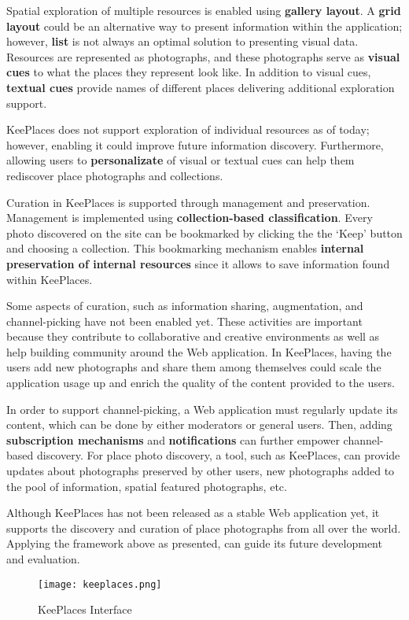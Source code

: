 {Spatial exploration of multiple resources is enabled using \textbf{gallery layout}. A \textbf{grid layout} could be an alternative way to present information within the application; however, \textbf{list} is not always an optimal solution to presenting visual data. 
Resources are represented as photographs, and these photographs serve as \textbf{visual cues} to what the places they represent look like. In addition to visual cues, \textbf{textual cues} provide names of different places delivering additional exploration support.

KeePlaces does not support exploration of individual resources as of today; however, enabling it could improve future information discovery. Furthermore, allowing users to \textbf{personalizate} of visual or textual cues can help them rediscover place photographs and collections. 

\pagebreak

Curation in KeePlaces is supported through management and preservation. Management is implemented using \textbf{collection-based classification}.
Every photo discovered on the site can be bookmarked by clicking the the `Keep' button and choosing a collection. This bookmarking mechanism enables \textbf{internal preservation of internal resources} since it allows to save information found within KeePlaces. 

Some aspects of curation, such as information sharing, augmentation, and channel-picking have not been enabled yet. These activities are important because they contribute to collaborative and creative environments as well as help building community around the Web application. In KeePlaces, having the users add new photographs and share them among themselves could scale the application usage up and enrich the quality of the content provided to the users. 

In order to support channel-picking, a Web application must regularly update its content, which can be done by either moderators or general users. Then, adding \textbf{subscription mechanisms} and \textbf{notifications} can further empower channel-based discovery.  For place photo discovery, a tool, such as KeePlaces, can provide updates about photographs preserved by other users, new photographs added to the pool of information, spatial featured photographs, etc.

Although KeePlaces has not been released as a stable Web application yet, it supports the discovery and curation of place photographs from all over the world. Applying the framework above as presented, can guide its future development and evaluation.  

\begin{figure}[ht!]
	\noindent
	\centering
	\texttt{[image: keeplaces.png]}
	\caption{KeePlaces Interface}
	\label{fig:keeplaces} 
\end{figure}

} %

